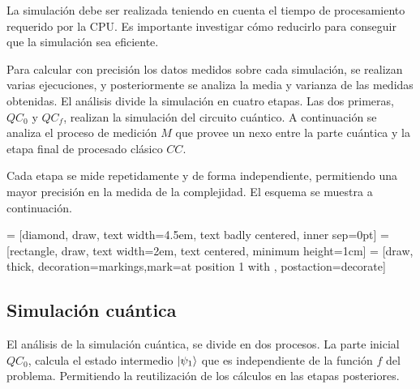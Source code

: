 La simulación debe ser realizada teniendo en cuenta el tiempo de procesamiento 
requerido por la CPU. Es importante investigar cómo reducirlo para conseguir que 
la simulación sea eficiente.

Para calcular con precisión los datos medidos sobre cada simulación, se realizan 
varias ejecuciones, y posteriormente se analiza la media y varianza de las 
medidas obtenidas. El análisis divide la simulación en cuatro etapas. Las dos 
primeras, $QC_0$ y $QC_f$, realizan la simulación del circuito cuántico. A 
continuación se analiza el proceso de medición $M$ que provee un nexo entre la 
parte cuántica y la etapa final de procesado clásico $CC$.

Cada etapa se mide repetidamente y de forma independiente, permitiendo una mayor 
precisión en la medida de la complejidad. El esquema se muestra a continuación.
%
\begin{center}
 = [diamond, draw, text width=4.5em, text badly centered, 
inner sep=0pt]
 = [rectangle, draw, text width=2em, text centered, minimum 
height=1cm]
 = [draw, thick, decoration={markings,mark=at position 
1 with {}}, postaction={decorate}]
%
\end{center}
%

\subsection{Simulación cuántica}
El análisis de la simulación cuántica, se divide en dos procesos. La parte 
inicial $QC_0$, calcula el estado intermedio $\ket{\psi_{1}}$ que es independiente de 
la función $f$ del problema. Permitiendo la reutilización de los cálculos en las 
etapas posteriores.

